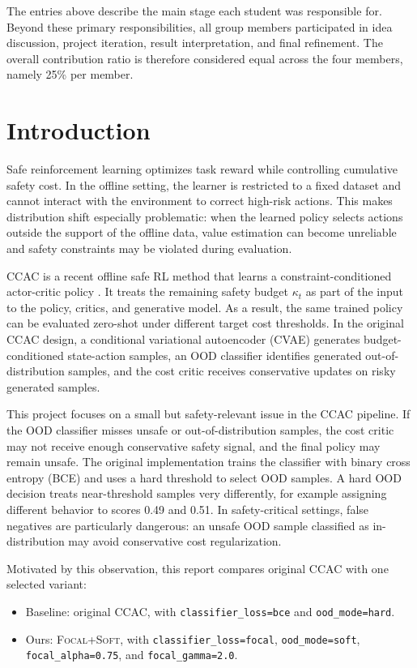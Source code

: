 \documentclass[11pt,a4paper]{article}
\newcommand{\ccac}{\textsc{CCAC}}
\newcommand{\ours}{\textsc{Focal+Soft}}
\begin{document}
The entries above describe the main stage each student was responsible for.
Beyond these primary responsibilities, all group members participated in idea
discussion, project iteration, result interpretation, and final refinement. The
overall contribution ratio is therefore considered equal across the four
members, namely 25\% per member.

\section{Introduction}

Safe reinforcement learning optimizes task reward while controlling cumulative
safety cost. In the offline setting, the learner is restricted to a fixed
dataset and cannot interact with the environment to correct high-risk actions.
This makes distribution shift especially problematic: when the learned policy
selects actions outside the support of the offline data, value estimation can
become unreliable and safety constraints may be violated during evaluation.

\ccac{} is a recent offline safe RL method that learns a
constraint-conditioned actor-critic policy \cite{guo2025ccac}. It treats the
remaining safety budget \(\kappa_t\) as part of the input to the policy,
critics, and generative model. As a result, the same trained policy can be
evaluated zero-shot under different target cost thresholds. In the original
\ccac{} design, a conditional variational autoencoder (CVAE) generates
budget-conditioned state-action samples, an OOD classifier identifies generated
out-of-distribution samples, and the cost critic receives conservative updates
on risky generated samples.

This project focuses on a small but safety-relevant issue in the \ccac{}
pipeline. If the OOD classifier misses unsafe or out-of-distribution samples,
the cost critic may not receive enough conservative safety signal, and the
final policy may remain unsafe. The original implementation trains the
classifier with binary cross entropy (BCE) and uses a hard threshold to select
OOD samples. A hard OOD decision treats near-threshold samples very
differently, for example assigning different behavior to scores 0.49 and
0.51. In safety-critical settings, false negatives are particularly dangerous:
an unsafe OOD sample classified as in-distribution may avoid conservative cost
regularization.

Motivated by this observation, this report compares original \ccac{} with one
selected variant:
\begin{itemize}
  \item Baseline: original \ccac{}, with \texttt{classifier\_loss=bce} and
  \texttt{ood\_mode=hard}.
  \item Ours: \ours{}, with \texttt{classifier\_loss=focal},
  \texttt{ood\_mode=soft}, \texttt{focal\_alpha=0.75}, and
  \texttt{focal\_gamma=2.0}.
\end{itemize}
\end{document}
